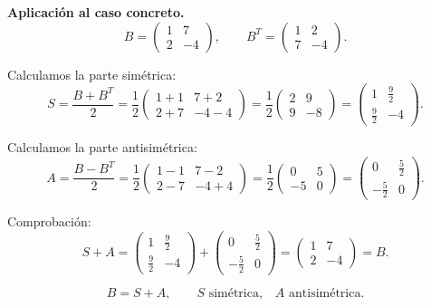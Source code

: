 \documentclass[a4paper,12pt]{article}
\begin{document}
\begin{ejercicio}[title=Ejercicio 6]
\textbf{Aplicación al caso concreto.}
\[
B=
\begin{pmatrix}
1 & 7\\
2 & -4
\end{pmatrix}, \qquad
B^T=
\begin{pmatrix}
1 & 2\\
7 & -4
\end{pmatrix}.
\]

Calculamos la parte simétrica:
\[
S=\frac{B+B^T}{2}=\frac{1}{2}
\begin{pmatrix}
1+1 & 7+2\\[4pt]
2+7 & -4-4
\end{pmatrix}
=\frac{1}{2}
\begin{pmatrix}
2 & 9\\[4pt]
9 & -8
\end{pmatrix}
=
\begin{pmatrix}
1 & \tfrac{9}{2}\\[4pt]
\tfrac{9}{2} & -4
\end{pmatrix}.
\]

Calculamos la parte antisimétrica:
\[
A=\frac{B-B^T}{2}=\frac{1}{2}
\begin{pmatrix}
1-1 & 7-2\\[4pt]
2-7 & -4+4
\end{pmatrix}
=\frac{1}{2}
\begin{pmatrix}
0 & 5\\[4pt]
-5 & 0
\end{pmatrix}
=
\begin{pmatrix}
0 & \tfrac{5}{2}\\[4pt]
-\tfrac{5}{2} & 0
\end{pmatrix}.
\]

Comprobación:
\[
S+A =
\begin{pmatrix}
1 & \tfrac{9}{2}\\[4pt]
\tfrac{9}{2} & -4
\end{pmatrix}
+
\begin{pmatrix}
0 & \tfrac{5}{2}\\[4pt]
-\tfrac{5}{2} & 0
\end{pmatrix}
=
\begin{pmatrix}
1 & 7\\[4pt]
2 & -4
\end{pmatrix}=B.
\]

\[
\boxed{B = S+A, \qquad S\text{ simétrica,} \quad A\text{ antisimétrica.}}
\]
\end{ejercicio}
\end{document}
